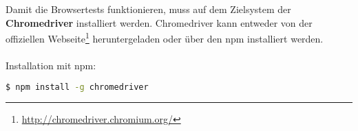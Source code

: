 Damit die Browsertests funktionieren, muss auf dem Zielsystem der
\textbf{Chromedriver} installiert werden. Chromedriver kann entweder von der
offiziellen Webseite\footnote{\url{http://chromedriver.chromium.org/}}
heruntergeladen oder über den \Gls{npm} installiert werden.\\
\\
Installation mit \Gls{npm}:

\begin{lstlisting}[language=bash,frame=single]
$ npm install -g chromedriver
\end{lstlisting}
